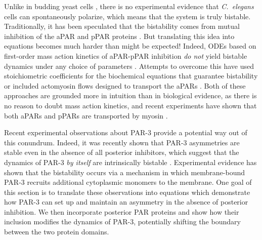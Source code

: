 \documentclass[11pt]{article}
\newcommand{\6}[1]{#1_{\text{6}}}
\newcommand{\3}[1]{#1_{\text{3}}}
\begin{document}
Unlike in budding yeast cells \cite{mogilner2012cell}, there is no experimental evidence that \emph{C.\ elegans} cells can spontaneously polarize, which means that the system is truly bistable. Traditionally, it has been speculated that the bistability comes from mutual inhibition of the aPAR and pPAR proteins \cite{halatek2018self, trong2014parameter}. But translating this idea into equations becomes much harder than might be expected! Indeed, ODEs based on first-order mass action kinetics of aPAR-pPAR inhibition \emph{do not} yield bistable dynamics under any choice of parameters \cite{dawes20113}. Attempts to overcome this have used stoichiometric coefficients for the biochemical equations that guarantee bistability \cite{goehring2011polarization, gross2019guiding} or included actomyosin flows designed to transport the aPARs \cite{TH2008}. Both of these approaches are grounded more in intuition than in biological evidence, as there is no reason to doubt mass action kinetics, and recent experiments have shown that both aPARs and pPARs are transported by myosin \cite{illukkumbura2023design}. 

Recent experimental observations about PAR-3 provide a potential way out of this conundrum. Indeed, it was recently shown that PAR-3 asymmetries are stable even in the absence of all posterior inhibitors, which suggest that the dynamics of PAR-3 \emph{by itself} are intrinsically bistable \cite{lang2023oligomerization}. Experimental evidence has shown that the bistability occurs via a mechanism in which membrane-bound PAR-3 recruits additional cytoplasmic monomers to the membrane. One goal of this section is to translate these observations into equations which demonstrate how PAR-3 can set up and maintain an asymmetry in the absence of posterior inhibition. We then incorporate posterior PAR proteins and show how their inclusion modifies the dynamics of PAR-3, potentially shifting the boundary between the two protein domains. 
\end{document}
